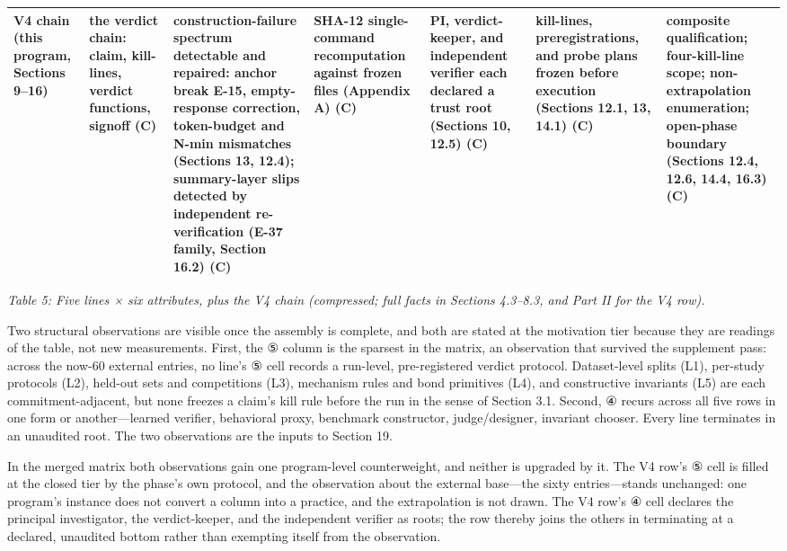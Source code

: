 \documentclass[11pt]{article}
\begin{document}
\begin{tabularx}{\textwidth}{@{}>{\raggedright\arraybackslash}p{} *{6}{>{\raggedright\arraybackslash}p{}}@{}}
V4 chain (this program, Sections 9–16) & the verdict chain: claim, kill-lines, verdict functions, signoff (C) & construction-failure spectrum detectable and repaired: anchor break E-15, empty-response correction, token-budget and N-min mismatches (Sections 13, 12.4); summary-layer slips detected by independent re-verification (E-37 family, Section 16.2) (C) & SHA-12 single-command recomputation against frozen files (Appendix A) (C) & PI, verdict-keeper, and independent verifier each declared a trust root (Sections 10, 12.5) (C) & kill-lines, preregistrations, and probe plans frozen before execution (Sections 12.1, 13, 14.1) (C) & composite qualification; four-kill-line scope; non-extrapolation enumeration; open-phase boundary (Sections 12.4, 12.6, 14.4, 16.3) (C) \\
\bottomrule
\end{tabularx}
\endgroup
\begin{center}\emph{Table 5: Five lines × six attributes, plus the V4 chain (compressed; full facts in Sections 4.3–8.3, and Part II for the V4 row).}\end{center}
\noindent Two structural observations are visible once the assembly is complete, and both are stated at the motivation tier because they are readings of the table, not new measurements. First, the ⑤ column is the sparsest in the matrix, an observation that survived the supplement pass: across the now-60 external entries, no line's ⑤ cell records a run-level, pre-registered verdict protocol. Dataset-level splits (L1), per-study protocols (L2), held-out sets and competitions (L3), mechanism rules and bond primitives (L4), and constructive invariants (L5) are each commitment-adjacent, but none freezes a claim's kill rule before the run in the sense of Section 3.1. Second, ④ recurs across all five rows in one form or another—learned verifier, behavioral proxy, benchmark constructor, judge/designer, invariant chooser. Every line terminates in an unaudited root. The two observations are the inputs to Section 19.\par
\noindent In the merged matrix both observations gain one program-level counterweight, and neither is upgraded by it. The V4 row's ⑤ cell is filled at the closed tier by the phase's own protocol, and the observation about the external base—the sixty entries—stands unchanged: one program's instance does not convert a column into a practice, and the extrapolation is not drawn. The V4 row's ④ cell declares the principal investigator, the verdict-keeper, and the independent verifier as roots; the row thereby joins the others in terminating at a declared, unaudited bottom rather than exempting itself from the observation.\par
\end{document}
